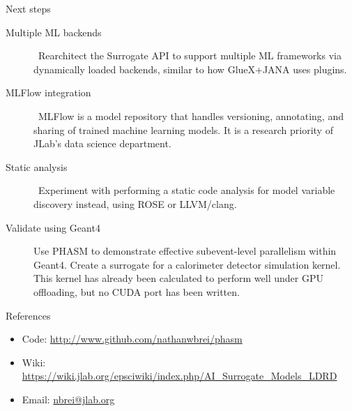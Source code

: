 \begin{block}{Next steps}

\begin{description}
\item[Multiple ML backends]\ Rearchitect the Surrogate API to support multiple ML frameworks via dynamically loaded backends, similar to how GlueX+JANA uses plugins.

\item[MLFlow integration]\ MLFlow is a model repository that handles versioning, annotating, and sharing of trained machine learning models. It is a research priority of JLab’s data science department.

\item[Static analysis]\ Experiment with performing a static code analysis for model variable discovery instead, using ROSE or LLVM/clang. 

\item[Validate using Geant4] Use PHASM to demonstrate effective subevent-level parallelism within Geant4. Create a surrogate for a calorimeter detector simulation kernel. This kernel has already been calculated to perform well under GPU offloading, but no CUDA port has been written.

\end{description}

\end{block}


\begin{block}{References}
\begin{itemize}
\item Code: \href{http://www.github.com/nathanwbrei/phasm}{http://www.github.com/nathanwbrei/phasm}
\item Wiki: \href{https://wiki.jlab.org/epsciwiki/index.php/AI_Surrogate_Models_LDRD}{https://wiki.jlab.org/epsciwiki/index.php/AI_Surrogate_Models_LDRD}
\item Email: \href{mailto:nbrei@jlab.org}{nbrei@jlab.org}
\end{itemize}
\end{block}
